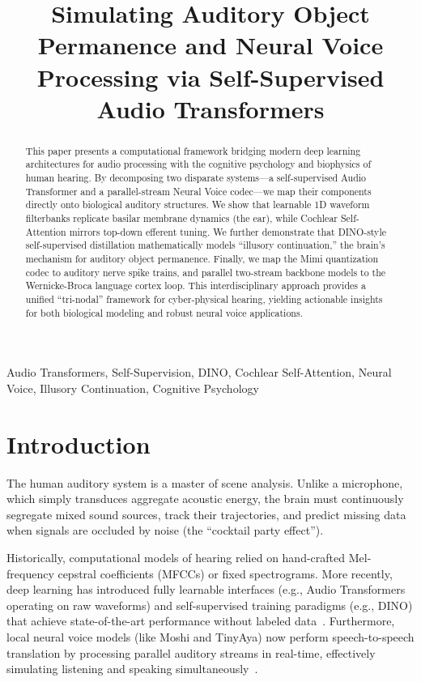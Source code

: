 \documentclass[conference]{IEEEtran}
\begin{document}
\title{Simulating Auditory Object Permanence and Neural Voice Processing via Self-Supervised Audio Transformers}

\author{}

\maketitle

\begin{abstract}
This paper presents a computational framework bridging modern deep learning architectures for audio processing with the cognitive psychology and biophysics of human hearing. By decomposing two disparate systems---a self-supervised Audio Transformer and a parallel-stream Neural Voice codec---we map their components directly onto biological auditory structures. We show that learnable 1D waveform filterbanks replicate basilar membrane dynamics (the ear), while Cochlear Self-Attention mirrors top-down efferent tuning. We further demonstrate that DINO-style self-supervised distillation mathematically models ``illusory continuation,'' the brain's mechanism for auditory object permanence. Finally, we map the Mimi quantization codec to auditory nerve spike trains, and parallel two-stream backbone models to the Wernicke-Broca language cortex loop. This interdisciplinary approach provides a unified ``tri-nodal'' framework for cyber-physical hearing, yielding actionable insights for both biological modeling and robust neural voice applications.
\end{abstract}

\begin{IEEEkeywords}
Audio Transformers, Self-Supervision, DINO, Cochlear Self-Attention, Neural Voice, Illusory Continuation, Cognitive Psychology
\end{IEEEkeywords}

\section{Introduction}

The human auditory system is a master of scene analysis. Unlike a microphone, which simply transduces aggregate acoustic energy, the brain must continuously segregate mixed sound sources, track their trajectories, and predict missing data when signals are occluded by noise (the ``cocktail party effect''). 

Historically, computational models of hearing relied on hand-crafted Mel-frequency cepstral coefficients (MFCCs) or fixed spectrograms. More recently, deep learning has introduced fully learnable interfaces (e.g., Audio Transformers operating on raw waveforms) and self-supervised training paradigms (e.g., DINO) that achieve state-of-the-art performance without labeled data~\cite{b1, b2}. Furthermore, local neural voice models (like Moshi and TinyAya) now perform speech-to-speech translation by processing parallel auditory streams in real-time, effectively simulating listening and speaking simultaneously~\cite{b3, b4}.
\end{document}
